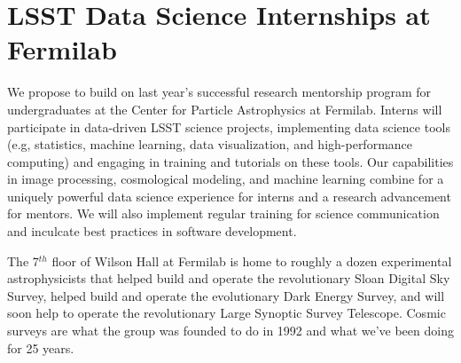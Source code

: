 
\section{LSST Data Science Internships at Fermilab}


 
We propose to build on last year's successful research mentorship program for undergraduates at the Center for Particle Astrophysics at Fermilab.
Interns will participate in data-driven LSST science projects, implementing data science tools (e.g, statistics, machine learning, data visualization, and high-performance computing) and engaging in training and tutorials on these tools.
Our capabilities in image processing, cosmological modeling, and machine learning combine for a uniquely powerful
data science experience for interns and a research advancement for mentors.
We will also implement regular training for science communication and inculcate best practices in software development.


The 7$^{th}$ floor of Wilson Hall at Fermilab is home to roughly a dozen
experimental astrophysicists that helped build and operate
the revolutionary Sloan Digital Sky Survey, helped build and operate
the evolutionary Dark Energy Survey, and will soon help to operate 
the revolutionary Large Synoptic Survey Telescope. Cosmic surveys are
what the group was founded to do in 1992 and what we've been doing for 25 years.


